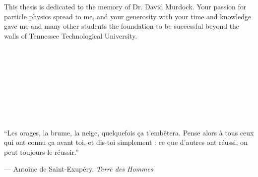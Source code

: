 \begin{vplace}
\noindent
This thesis is dedicated to the memory of Dr. David Murdock.
Your passion for particle physics spread to me, and your 
generosity with your time and knowledge gave me and many
other students the foundation to be successful beyond the
walls of Tennessee Technological University.
\\
\\
\\
\\
\\
\\
\\
\\
\\
\\
  ``Les orages, la brume, la neige, quelquefois {\c c}a t'emb{\^e}tera. 
Pense alors {\`a} tous ceux qui ont connu {\c c}a avant toi, 
et dis-toi simplement : ce que d'autres ont r{\'e}ussi, 
on peut toujours le r{\'e}ussir.''

--- Antoine de Saint-Exup{\'e}ry, \emph{Terre des Hommes}
\end{vplace}
